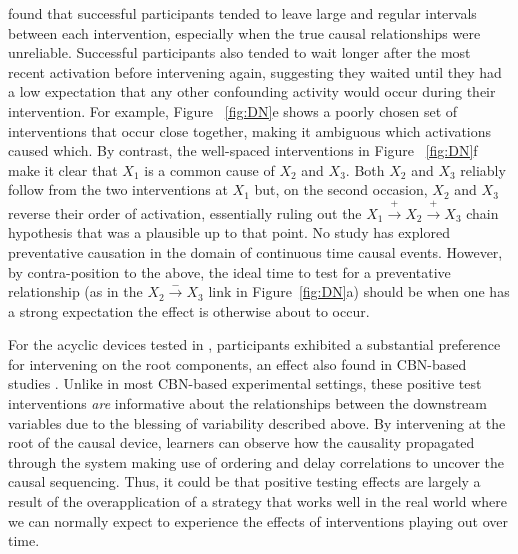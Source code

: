 \documentclass{cambridge7A}%
\newcommand{\ttodo}[2][]{\vspace{0.1cm} \hfil \todo[caption={\textbf{TG}}, size=\footnotesize, color = orange, inline, #1]{#2}}
\begin{document}
\cite{bramley2017dynamic} found that successful participants tended to leave large and regular intervals between each intervention, especially when the true causal relationships were unreliable.  Successful participants also tended to wait longer after the most recent activation before intervening again, suggesting they waited until they had a low expectation that any other confounding activity would occur during their intervention.  For example, Figure ~\ref{fig:DN}e shows a poorly chosen set of interventions that occur close together, making it ambiguous which activations caused which.  By contrast, the well-spaced interventions in Figure ~\ref{fig:DN}f make it clear that $X_1$ is a common cause of $X_2$ and $X_3$.  Both $X_2$ and $X_3$ reliably follow from the two interventions at $X_1$ but, on the second occasion, $X_2$ and $X_3$ reverse their order of activation, essentially ruling out the $X_1\!\stackrel{+}\rightarrow\!X_2\!\stackrel{+}\rightarrow\!X_3$ chain hypothesis that was a plausible up to that point.  No study has explored preventative causation in the domain of continuous time causal events. However, by contra-position to the above, the ideal time to test for a preventative relationship (as in the $X_2\!\stackrel{-}\rightarrow\!X_3$ link in Figure~\ref{fig:DN}a) should be when one has a strong expectation the effect is otherwise about to occur.  

For the acyclic devices tested in \cite{bramley2017dynamic}, participants exhibited a substantial preference for intervening on the root components, an effect also found in CBN-based studies \citep[e.g.,][]{coenen2015strategies, bramley2015fcs}.  Unlike in most CBN-based experimental settings, these positive test interventions \emph{are} informative about the relationships between the downstream variables due to the blessing of variability described above.   By intervening at the root of the causal device, learners can  observe how the causality propagated through the system making use of ordering and delay correlations to uncover the causal sequencing. Thus, it could be that positive testing effects are largely a result of the overapplication of a strategy that works well in the real world where we can normally expect to experience the effects of interventions playing out over time.%
\end{document}
